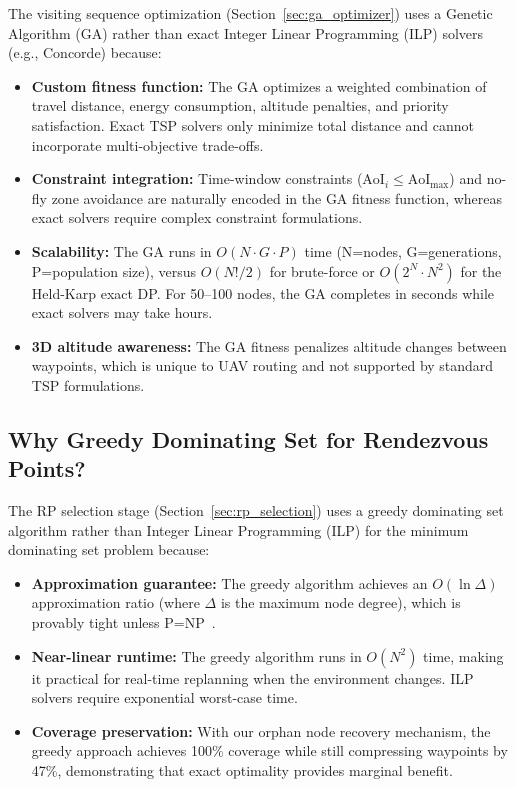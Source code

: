 \documentclass[12pt, a4paper, oneside]{report}
\begin{document}
The visiting sequence optimization (Section~\ref{sec:ga_optimizer}) uses a Genetic Algorithm (GA) rather than exact Integer Linear Programming (ILP) solvers (e.g., Concorde) because:
\begin{itemize}
    \item \textbf{Custom fitness function:} The GA optimizes a weighted combination of travel distance, energy consumption, altitude penalties, and priority satisfaction. Exact TSP solvers only minimize total distance and cannot incorporate multi-objective trade-offs.
    \item \textbf{Constraint integration:} Time-window constraints ($\text{AoI}_i \leq \text{AoI}_{\max}$) and no-fly zone avoidance are naturally encoded in the GA fitness function, whereas exact solvers require complex constraint formulations.
    \item \textbf{Scalability:} The GA runs in $O(N \cdot G \cdot P)$ time (N=nodes, G=generations, P=population size), versus $O(N! / 2)$ for brute-force or $O(2^N \cdot N^2)$ for the Held-Karp exact DP. For 50--100 nodes, the GA completes in seconds while exact solvers may take hours.
    \item \textbf{3D altitude awareness:} The GA fitness penalizes altitude changes between waypoints, which is unique to UAV routing and not supported by standard TSP formulations.
\end{itemize}

\subsection{Why Greedy Dominating Set for Rendezvous Points?}

The RP selection stage (Section~\ref{sec:rp_selection}) uses a greedy dominating set algorithm rather than Integer Linear Programming (ILP) for the minimum dominating set problem because:
\begin{itemize}
    \item \textbf{Approximation guarantee:} The greedy algorithm achieves an $O(\ln \Delta)$ approximation ratio (where $\Delta$ is the maximum node degree), which is provably tight unless P=NP~\cite{garey1979computers}.
    \item \textbf{Near-linear runtime:} The greedy algorithm runs in $O(N^2)$ time, making it practical for real-time replanning when the environment changes. ILP solvers require exponential worst-case time.
    \item \textbf{Coverage preservation:} With our orphan node recovery mechanism, the greedy approach achieves 100\% coverage while still compressing waypoints by 47\%, demonstrating that exact optimality provides marginal benefit.
\end{itemize}
\end{document}
